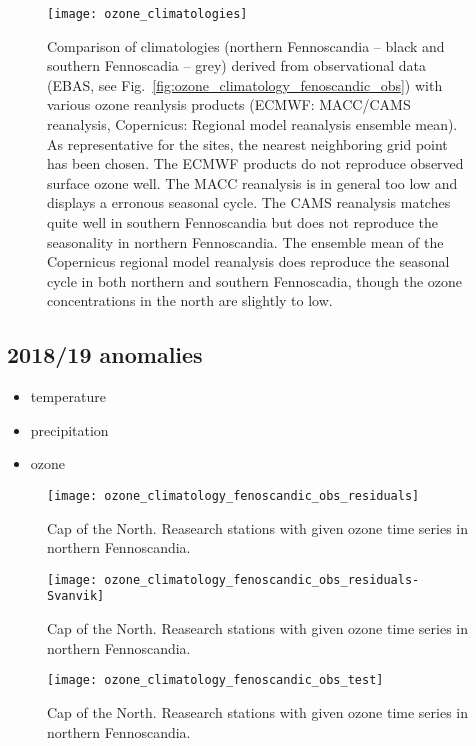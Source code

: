\documentclass[bg, manuscript]{copernicus}
\begin{document}
\begin{figure}[t]
  \texttt{[image: ozone\_climatologies]}
  \caption{Comparison of climatologies (northern Fennoscandia -- black and southern Fennoscadia -- grey) derived from observational data (EBAS, see Fig.~\ref{fig:ozone_climatology_fenoscandic_obs}) with various ozone reanlysis products (ECMWF: MACC/CAMS reanalysis, Copernicus: Regional model reanalysis ensemble mean). As representative for the sites, the nearest neighboring grid point has been chosen. The ECMWF products do not reproduce observed surface ozone well. The MACC reanalysis is in general too low and displays a erronous seasonal cycle. The CAMS reanalysis matches quite well in southern Fennoscandia but does not reproduce the seasonality in northern Fennoscandia. The ensemble mean of the Copernicus regional model reanalysis does reproduce the seasonal cycle in both northern and southern Fennoscadia, though the ozone concentrations in the north are slightly to low.}
  \label{fig:ozone_climatologies}
\end{figure}



\subsection{2018/19 anomalies}
\begin{itemize}
\item temperature
\item precipitation
\item ozone
\end{itemize}

\begin{figure}[t]
  \texttt{[image: ozone\_climatology\_fenoscandic\_obs\_residuals]}
  \label{fig:ozone_climatology_fenoscandic_obs_residuals}
\caption{Cap of the North. Reasearch stations with given ozone time series in northern Fennoscandia.}
\end{figure}

\begin{figure}[t]
  \texttt{[image: ozone\_climatology\_fenoscandic\_obs\_residuals-Svanvik]}
  \caption{Cap of the North. Reasearch stations with given ozone time series in northern Fennoscandia.}
   \label{fig:ozone_climatology_fenoscandic_obs_residuals-Svanvik}
\end{figure}

\begin{figure}[t]
  \texttt{[image: ozone\_climatology\_fenoscandic\_obs\_test]}
  \label{fig:ozone_climatology_fenoscandic_obs_test}
\caption{Cap of the North. Reasearch stations with given ozone time series in northern Fennoscandia.}
\end{figure}
\end{document}
